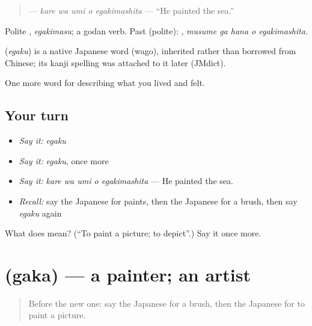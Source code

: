 \begin{quote}
\textbf{  } — \emph{kare wa umi o egakimashita} — \textquotedblleft{}He painted the sea.\textquotedblright{}
\end{quote}

Polite \textbf{}, \emph{egakimasu}; a godan verb. Past (polite): \textbf{  }, \emph{musume ga hana o egakimashita}.

\begin{cousinweb}
\textbf{} (\emph{egaku}) is a native Japanese word (wago), inherited rather than borrowed from Chinese; its kanji spelling was attached to it later (JMdict).
\end{cousinweb}

\begin{grammarlens}[title={What you've built}]
One more word for describing what you lived and felt.
\end{grammarlens}

\subsection*{Your turn}
\begin{itemize}
\raggedright
  \item \emph{Say it:} \emph{egaku}
  \item \emph{Say it:} \emph{egaku}, once more
  \item \emph{Say it:} \emph{kare wa umi o egakimashita} — He painted the sea.
  \item \emph{Recall:} say the Japanese for paints, then the Japanese for a brush, then say \emph{egaku} again
\end{itemize}

\begin{tcolorbox}[breakable,colback=teal!4,colframe=teal!35!black,title={Before you move on}]
What does  mean? (\textquotedblleft{}To paint a picture; to depict\textquotedblright{}.) Say it once more.
\end{tcolorbox}
\section[\texorpdfstring{\ja{がか} (gaka)}{がか (gaka)}]{ (gaka) — a painter; an artist}

\label{lesson:JA-C465-gaka}



\begin{quote}
Before the new one: say the Japanese for a brush, then the Japanese for to paint a picture.
\end{quote}

